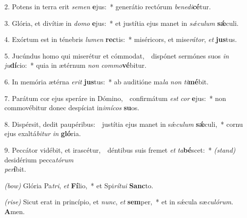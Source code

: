 2. Potens in terra erit \textit{se}\textit{men} \textbf{e}jus:~* generátio rectórum \textit{be}\textit{ne}\textit{di}\textbf{cé}tur.

3. Glória, et divítiæ in \textit{do}\textit{mo} \textbf{e}jus:~* et justítia ejus manet in \textit{s\'{\ae}}\textit{cu}\textit{lum} \textbf{s\'{\ae}}culi.

4. Exórtum est in ténebris \textit{lu}\textit{men} \textbf{rec}tis:~* miséricors, et mise\textit{rá}\textit{tor}, \textit{et} \textbf{jus}tus.

5. Jucúndus homo qui miserétur et cómmodat,~{\color{red}\GreDagger}\ dispónet sermónes suos \textit{in} \textit{ju}\textbf{dí}cio:~* quia in ætérnum \textit{non} \textit{com}\textit{mo}\textbf{vé}bitur.

6. In memória ætérna \textit{e}\textit{rit} \textbf{jus}tus:~* ab auditióne ma\textit{la} \textit{non} \textit{ti}\textbf{mé}bit.

7. Parátum cor ejus speráre in Dómino,~{\color{red}\GreDagger}\ confirmátum \textit{est} \textit{cor} \textbf{e}jus:~* non commovébitur donec despíciat in\textit{i}\textit{mí}\textit{cos} \textbf{su}os.

8. Dispérsit, dedit paupéribus:~{\color{red}\GreDagger}\ justítia ejus manet in s\'{\ae}\textit{cu}\textit{lum} \textbf{s\'{\ae}}culi,~* cornu ejus exaltá\textit{bi}\textit{tur} \textit{in} \textbf{gló}ria.

9. Peccátor vidébit, et irascétur,~{\color{red}\GreDagger}\ déntibus suis fremet \textit{et} \textit{ta}\textbf{bé}scet:~* {\color{red}\textit{(stand)}} desidérium pecca\textit{tó}\textit{rum}\\ \textit{per}\textbf{í}bit.

{\color{red}\textit{(bow)}} Glória Pa\textit{tri}, \textit{et} \textbf{Fí}lio,~* et Spi\textit{rí}\textit{tu}\textit{i} \textbf{Sanc}to.

{\color{red}\textit{(rise)}} Sicut erat in princípio, et \textit{nunc}, \textit{et} \textbf{sem}per,~* et in s\'{\ae}cula sæ\textit{cu}\textit{ló}\textit{rum}. \textbf{A}men.